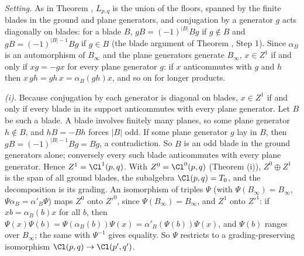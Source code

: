 \emph{Setting.} As in Theorem , $L_{p,q}$ is the union of the floors, spanned by the finite blades in the ground and plane generators, and conjugation by a generator $g$ acts diagonally on blades: for a blade $B$, $gB = (-1)^{|B|}Bg$ if $g \notin B$ and $gB = (-1)^{|B|-1}Bg$ if $g \in B$ (the blade argument of Theorem , Step 1). Since $\alpha_{B}$ is an automorphism of $B_{\infty}$ and the plane generators generate $B_{\infty}$, $x \in Z^{1}$ if and only if $xg = -gx$ for every plane generator $g$: if $x$ anticommutes with $g$ and $h$ then $x\,gh = gh\,x = \alpha_{B}(gh)x$, and so on for longer products.

\emph{(i).} Because conjugation by each generator is diagonal on blades, $x \in Z^{1}$ if and only if every blade in its support anticommutes with every plane generator. Let $B$ be such a blade. A blade involves finitely many planes, so some plane generator $h \notin B$, and $hB = -Bh$ forces $|B|$ odd. If some plane generator $g$ lay in $B$, then $gB = (-1)^{|B|-1}Bg = Bg$, a contradiction. So $B$ is an odd blade in the ground generators alone; conversely every such blade anticommutes with every plane generator. Hence $Z^{1} = \Cl^{1}(p,q)$. With $Z^{0} = \Cl^{0}(p,q)$ (Theorem (i)), $Z^{0} \oplus Z^{1}$ is the span of all ground blades, the subalgebra $\Cl(p,q) = T_{0}$, and the decomposition is its grading. An isomorphism of triples $\Psi$ (with $\Psi(B_{\infty}) = B_{\infty}$, $\Psi\alpha_{B} = \alpha'_{B}\Psi$) maps $Z^{0}$ onto $Z'^{0}$, since $\Psi(B_{\infty}) = B_{\infty}$, and $Z^{1}$ onto $Z'^{1}$: if $xb = \alpha_{B}(b)x$ for all $b$, then $\Psi(x)\Psi(b) = \Psi(\alpha_{B}(b))\Psi(x) = \alpha'_{B}(\Psi(b))\Psi(x)$, and $\Psi(b)$ ranges over $B_{\infty}$; the same with $\Psi^{-1}$ gives equality. So $\Psi$ restricts to a grading-preserving isomorphism $\Cl(p,q) \to \Cl(p',q')$.

